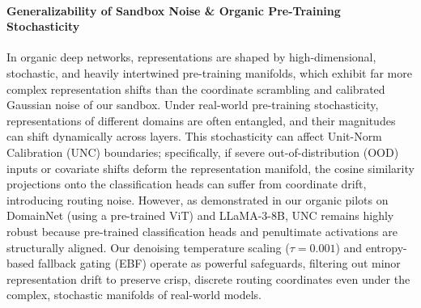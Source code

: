 \paragraph{Generalizability of Sandbox Noise \& Organic Pre-Training Stochasticity}
In organic deep networks, representations are shaped by high-dimensional, stochastic, and heavily intertwined pre-training manifolds, which exhibit far more complex representation shifts than the coordinate scrambling and calibrated Gaussian noise of our sandbox. Under real-world pre-training stochasticity, representations of different domains are often entangled, and their magnitudes can shift dynamically across layers. This stochasticity can affect Unit-Norm Calibration (UNC) boundaries; specifically, if severe out-of-distribution (OOD) inputs or covariate shifts deform the representation manifold, the cosine similarity projections onto the classification heads can suffer from coordinate drift, introducing routing noise. However, as demonstrated in our organic pilots on DomainNet (using a pre-trained ViT) and LLaMA-3-8B, UNC remains highly robust because pre-trained classification heads and penultimate activations are structurally aligned. Our denoising temperature scaling ($\tau = 0.001$) and entropy-based fallback gating (EBF) operate as powerful safeguards, filtering out minor representation drift to preserve crisp, discrete routing coordinates even under the complex, stochastic manifolds of real-world models.

